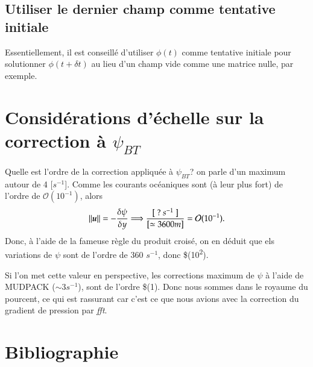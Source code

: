 \documentclass[10pt]{article}
\numberwithin{equation}{section}
\newcommand{\uu}{\vb*{u}}
\begin{document}
\subsection{Utiliser le dernier champ comme tentative initiale}
\label{sec:org1fa1ada}
Essentiellement, il est conseillé d'utiliser \(\phi(t)\) comme tentative initiale pour solutionner \(\phi(t+\delta t)\) au lieu d'un champ vide comme une matrice nulle, par exemple. 

\section{Considérations d'échelle sur la correction à \(\psi_{BT}\)}
\label{sec:org9179cad}

Quelle est l'ordre de la correction appliquée à \(\psi_{BT}\)? on parle d'un maximum autour de 4 [\(s^{-1}\)].
Comme les courants océaniques sont (à leur plus fort) de l'ordre de \(\mathcal{O}(10^{-1})\), alors
\begin{equation}
\norm{\uu} = - \frac{\delta \psi}{\delta y} \Longrightarrow \frac{[\ ?\ s^{-1}\ ]}{[\simeq 3600m]} = \mathcal{O}(10^{-1}).
\end{equation}
Donc, à l'aide de la fameuse règle du produit croisé, on en déduit que els variations de \(\psi\) sont de l'ordre de 360 \(s^{-1}\), donc \$(10\textsuperscript{2}).\bigskip

Si l'on met cette valeur en perspective, les corrections maximum de \(\psi\) à l'aide de MUDPACK (\(\sim 3 s^{-1}\)), sont de l'ordre \$(1).
Donc nous sommes dans le royaume du pourcent, ce qui est rassurant car c'est ce que nous avions avec la correction du gradient de pression par \emph{fft}. 

\section{Bibliographie}
\label{sec:org9bca5f8}
\end{document}
